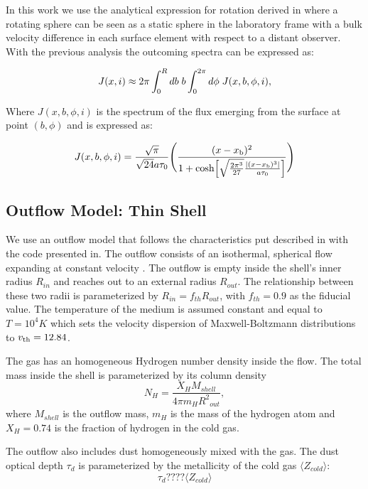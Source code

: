 \documentclass{latex/emulateapj}
\begin{document}
In this work we use the analytical expression for rotation derived in
\citep{Garavito14} where a rotating sphere can be seen as a static
sphere in the laboratory frame with a bulk velocity difference in each
surface element with respect 
to a distant observer. 
With the previous analysis the outcoming spectra can be expressed as:

\begin{equation}
J(x,i) \approx 2\pi \int_0^Rdb \hs b
\int_0^{2\pi}d\phi \hs J(x,b,\phi,i),
\end{equation}

Where $J(x, b, \phi, i)$ is the spectrum of the flux emerging from the
surface at point $(b, \phi)$ and is expressed as: 

\begin{equation}
J(x,b,\phi,i)=\frac{\sqrt{\pi}}{\sqrt{24}a\tau_0}\Bigg{(}\frac{(x-x_{\rm
    b})^2}{1+{\rm cosh}\Big{[}\sqrt{\frac{2\pi^3}{27}}\frac{|(x-x_{\rm
        b})^3|}{a\tau_0}\Big{]}}\Bigg{)} 
\end{equation}


\subsection{Outflow Model: Thin Shell}

We use an outflow model that follows the characteristics put described
in \citep{Verhamme06} with the code presented in\citep{Orsi12}.  
The outflow consists of an isothermal, spherical flow expanding at
constant velocity \vel.  
The outflow is empty inside the shell's inner radius $R_{in}$ and
reaches out to an external radius $R_{out}$.
The relationship between these two radii is parameterized by $R_{in} =
f_{th}R_{out}$, with $f_{th}=0.9$ as the fiducial value.  
The temperature of the medium is assumed constant and equal to $T=10^4
K$ which sets the velocity dispersion of Maxwell-Boltzmann
distributions to $v_{\rm th}=12.84$\kms. 

The gas has an homogeneous Hydrogen number density inside the flow. 
The total mass inside the shell is parameterized by its column density
\begin{equation}
\label{eq:nh}
N_H = \frac{X_H M_{shell}}{4\pi m_H {R^2}_{out}},
\end{equation}
%
where $M_{shell}$ is the outflow mass, $m_H$ is the mass of the
hydrogen atom and $X_H=0.74$ is the fraction of hydrogen in the cold
gas.

The outflow also includes dust homogeneously mixed with the gas. 
The dust optical depth $\tau_d$ is parameterized by the metallicity of
the cold gas $\langle Z_{cold} \rangle$: 
\begin{equation}
\label{eq:z}
\tau_{d} ???? \langle Z_{cold} \rangle
\end{equation}
\end{document}
